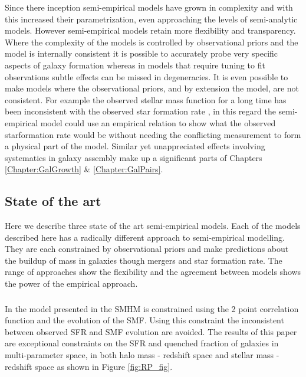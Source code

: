 Since there inception semi-empirical models have grown in complexity and with this increased their parametrization, even approaching the levels of semi-analytic models. However semi-empirical models retain more flexibility and transparency. Where the complexity of the models is controlled by observational priors and the model is internally consistent it is possible to accurately probe very specific aspects of galaxy formation whereas in models that require tuning to fit observations subtle effects can be missed in degeneracies. It is even possible to make models where the observational priors, and by extension the model, are not consistent. For example the observed stellar mass function for a long time has been inconsistent with the observed star formation rate \citep{Leja2015ReconcilingFunction,Lapi2017StellarEquation}, in this regard the semi-empirical model could use an empirical relation to show what the observed starformation rate would be without needing the conflicting measurement to form a physical part of the model. Similar yet unappreciated effects involving systematics in galaxy assembly make up a significant parts of Chapters \ref{Chapter:GalGrowth} \& \ref{Chapter:GalPairs}.

\subsection{State of the art}
Here we describe three state of the art semi-empirical models. Each of the models described here has a radically different approach to semi-empirical modelling. They are each constrained by observational priors and make predictions about the buildup of mass in galaxies though mergers and star formation rate. The range of approaches show the flexibility and the agreement between models shows the power of the empirical approach. 


\subsubsection{\citet{Rodriguez-Puebla2017ConstrainingProperties}}
In the model presented in \citet{Rodriguez-Puebla2017ConstrainingProperties} the SMHM is constrained using the 2 point correlation function and the evolution of the SMF. Using this constraint the inconsistent between observed SFR and SMF evolution are avoided. The results of this paper are exceptional constraints on the SFR and quenched fraction of galaxies in multi-parameter space, in both halo mass - redshift space and stellar mass - redshift space as shown in Figure \ref{fig:RP_fig}.

